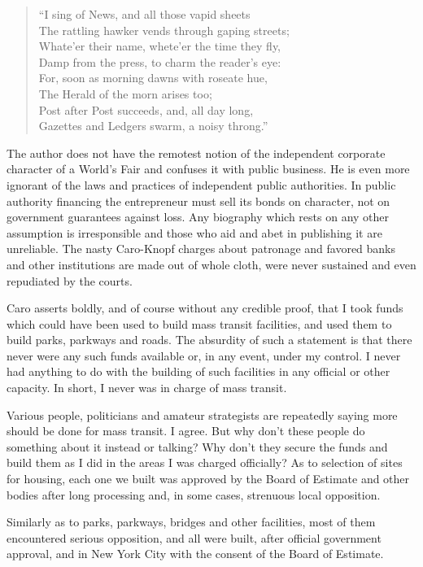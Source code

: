 \documentclass[11pt,letterpaper]{article}
\begin{document}
\begin{quote}
\enquote{I sing of News, and all those vapid sheets\\
The rattling hawker vends through gaping streets;\\
Whate'er their name, whete'er the time they fly,\\
Damp from the press, to charm the reader's eye:\\
For, soon as morning dawns with roseate hue,\\
The Herald of the morn arises too;\\
Post after Post succeeds, and, all day long,\\
Gazettes and Ledgers swarm, a noisy throng.}
\end{quote}

The author does not have the remotest notion of the independent corporate character of a World's Fair and confuses it with public business. He is even more ignorant of the laws and practices of independent public authorities. In public authority financing the entrepreneur must sell its bonds on character, not on government guarantees against loss. Any biography which rests on any other assumption is irresponsible and those who aid and abet in publishing it are unreliable. The nasty Caro-Knopf charges about patronage and favored banks and other institutions are made out of whole cloth, were never sustained and even repudiated by the courts.

Caro asserts boldly, and of course without any credible proof, that I took funds which could have been used to build mass transit facilities, and used them to build parks, parkways and roads. The absurdity of such a statement is that there never were any such funds available or, in any event, under my control. I never had anything to do with the building of such facilities in any official or other capacity. In short, I never was in charge of mass transit.

Various people, politicians and amateur strategists are repeatedly saying more should be done for mass transit. I agree. But why don't these people do something about it instead or talking? Why don't they secure the funds and build them as I did in the areas I was charged officially? As to selection of sites for housing, each one we built was approved by the Board of Estimate and other bodies after long processing and, in some cases, strenuous local opposition.

Similarly as to parks, parkways, bridges and other facilities, most of them encountered serious opposition, and all were built, after official government approval, and in New York City with the consent of the Board of Estimate.
\end{document}
